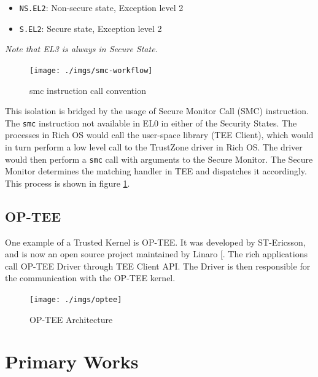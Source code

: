 \documentclass[a4paper, nobind]{templates/ociamthesis}
\providecommand{\tightlist}{%
  \setlength{\itemsep}{0pt}\setlength{\parskip}{0pt}}
\begin{document}
\begin{itemize}
\tightlist
\item
  \texttt{NS.EL2}: Non-secure state, Exception level 2
\item
  \texttt{S.EL2}: Secure state, Exception level 2
\end{itemize}

\emph{Note that EL3 is always in Secure State.}

\begin{figure}[H]

{\centering \texttt{[image: ./imgs/smc-workflow]} 

}

\caption{smc instruction call convention}\label{fig:smc-convention}
\end{figure}

This isolation is bridged by the usage of Secure Monitor Call (SMC) instruction.
The \texttt{smc} instruction not available in EL0 in either of the Security States.
The processes in Rich OS would call the user-space library (TEE Client),
which would in turn perform a low level call to the TrustZone driver in Rich OS.
The driver would then perform a \texttt{smc} call with arguments to the Secure Monitor.
The Secure Monitor determines the matching handler in TEE and dispatches it accordingly.
This process is shown in figure \ref{fig:smc-convention}.

\subsection{OP-TEE}\label{op-tee}

One example of a Trusted Kernel is OP-TEE. It was developed by ST-Ericsson,
and is now an open source project maintained by Linaro {[}\citeproc{ref-optee}{38}{]}.
The rich applications call OP-TEE Driver through TEE Client API. The Driver
is then responsible for the communication with the OP-TEE kernel.

\begin{figure}[H]

{\centering \texttt{[image: ./imgs/optee]} 

}

\caption{OP-TEE Architecture}\label{fig:optee-arch}
\end{figure}

\section{Primary Works}\label{primary-works}
\end{document}
